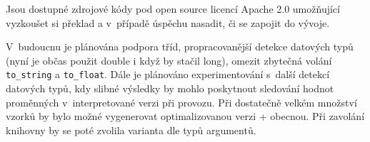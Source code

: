 \documentclass[czech]{ExcelAtFIT}
\newcommand{\function}[1]{\texttt{#1}}
\begin{document}



	Jsou dostupné zdrojové kódy pod open source licencí Apache 2.0 umožňující vyzkoušet si překlad a v~případě úspěchu nasadit, či se zapojit do vývoje.

	V~budoucnu je plánována podpora tříd, propracovanější detekce datových typů (nyní je občas použit double i když by stačil long), omezit zbytečná volání \function{to\_string} a \function{to\_float}. Dále je plánováno experimentování s~další detekcí datových typů, kdy slibné výsledky by mohlo poskytnout sledování hodnot pro\-měn\-ných v~interpretované verzi při provozu. Při dos\-ta\-teč\-ně velkém množství vzorků by bylo možné vygenerovat optimalizovanou verzi + obecnou. Při zavolání knihovny by se poté zvolila varianta dle typů argumentů.





\end{document}
